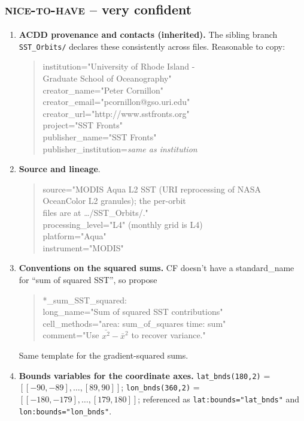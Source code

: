 \documentclass[11pt]{article}
\newcommand{\vc}{\textbf{very confident}}
\newcommand{\nh}{\textsc{nice-to-have}}
\begin{document}
\subsection{\nh{} -- \vc{}}\label{sec:nh-vc}

\begin{enumerate}
  \item \textbf{ACDD provenance and contacts (inherited).} The
    sibling branch \texttt{SST\_Orbits/} declares these
    consistently across files. Reasonable to copy:
    \begin{quote}\ttfamily
      institution="University of Rhode Island - \\
      \phantom{institution=}Graduate School of Oceanography" \\
      creator\_name="Peter Cornillon" \\
      creator\_email="pcornillon@gso.uri.edu" \\
      creator\_url="http://www.sstfronts.org" \\
      project="SST Fronts" \\
      publisher\_name="SST Fronts" \\
      publisher\_institution=\textit{same as institution}
    \end{quote}
  \item \textbf{Source and lineage}.
    \begin{quote}\ttfamily
      source="MODIS Aqua L2 SST (URI reprocessing of NASA \\
      \phantom{source=}OceanColor L2 granules); the per-orbit \\
      \phantom{source=}files are at \dots/SST\_Orbits/." \\
      processing\_level="L4"   (monthly grid is L4) \\
      platform="Aqua" \\
      instrument="MODIS"
    \end{quote}

  \item \textbf{Conventions on the squared sums.} CF doesn't have
    a standard\_name for ``sum of squared SST'', so propose
    \begin{quote}\ttfamily
      *\_sum\_SST\_squared:\\
      \phantom{xx}long\_name="Sum of squared SST contributions" \\
      \phantom{xx}cell\_methods="area: sum\_of\_squares time: sum" \\
      \phantom{xx}comment="Use $\bar{x^2}-\bar{x}^2$ to recover variance."
    \end{quote}
    Same template for the gradient-squared sums.

  \item \textbf{Bounds variables for the coordinate axes.}
    \texttt{lat\_bnds(180,2)} = $[[-90,-89],\ldots,[89,90]]$;
    \texttt{lon\_bnds(360,2)} = $[[-180,-179],\ldots,[179,180]]$;
    referenced as \texttt{lat:bounds="lat\_bnds"} and
    \texttt{lon:bounds="lon\_bnds"}.
\end{enumerate}
\end{document}

